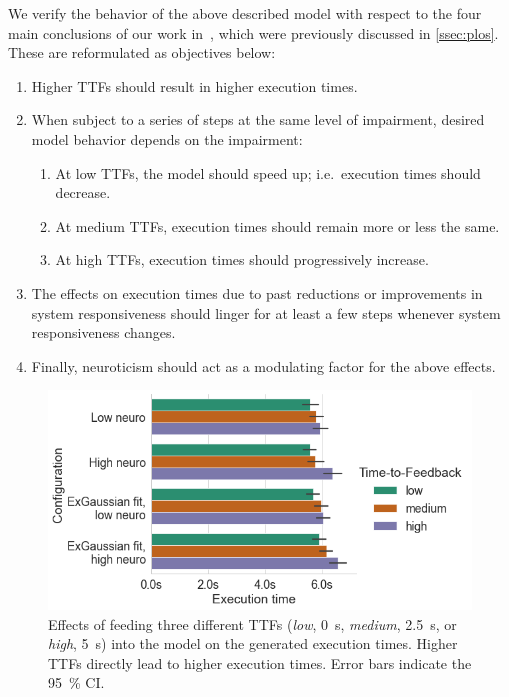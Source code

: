 We verify the behavior of the above described model with respect to the four main conclusions of our work in~\cite{olguinmunoz:impact2021}, which were previously discussed in \cref{ssec:plos}.
These are reformulated as objectives below:

\begin{enumerate}
    \item\label{it:ttftoexectime} Higher \acp{TTF} should result in higher execution times.
    \item\label{it:duration} When subject to a series of steps at the same level of impairment, desired model behavior depends on the impairment:
    \begin{enumerate}
        \item At low \acp{TTF}, the model should speed up; i.e.\ execution times should decrease.
        \item At medium \acp{TTF}, execution times should remain more or less the same.
        \item At high \acp{TTF}, execution times should progressively increase.
    \end{enumerate}
    \item The effects on execution times due to past reductions or improvements in system responsiveness should linger for at least a few steps whenever system responsiveness changes.
    \item\label{it:neuro} Finally, neuroticism should act as a modulating factor for the above effects.
\end{enumerate}

\begin{figure}
    \centering
    \includegraphics[width=\columnwidth]{figs/new_model/ttf_to_exectime.png}
    \caption{%
        Effects of feeding three different \acp{TTF} (\emph{low}, \SI{0}{\second}, \emph{medium}, \SI{2.5}{\second}, or \emph{high}, \SI{5}{\second}) into the model on the generated execution times.
        Higher \acp{TTF} directly lead to higher execution times.
        Error bars indicate the \SI{95}{\percent} \ac{CI}.
    }\label{fig:ttf_to_exectime}
\end{figure}

